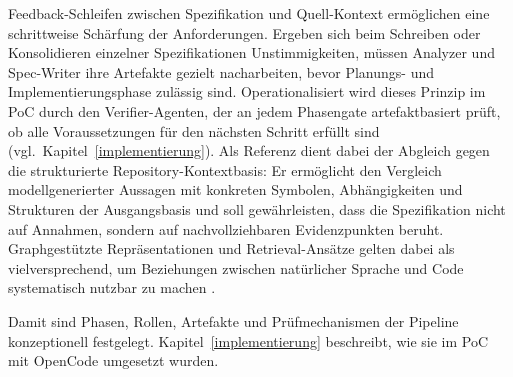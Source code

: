 Feedback-Schleifen zwischen Spezifikation und Quell-Kontext ermöglichen eine schrittweise Schärfung der Anforderungen. Ergeben sich beim Schreiben oder Konsolidieren einzelner Spezifikationen Unstimmigkeiten, müssen Analyzer und Spec-Writer ihre Artefakte gezielt nacharbeiten, bevor Planungs- und Implementierungsphase zulässig sind. Operationalisiert wird dieses Prinzip im PoC durch den Verifier-Agenten, der an jedem Phasengate artefaktbasiert prüft, ob alle Voraussetzungen für den nächsten Schritt erfüllt sind (vgl.\ Kapitel~\ref{implementierung}). Als Referenz dient dabei der Abgleich gegen die strukturierte Repository-Kontextbasis: Er ermöglicht den Vergleich modellgenerierter Aussagen mit konkreten Symbolen, Abhängigkeiten und Strukturen der Ausgangsbasis und soll gewährleisten, dass die Spezifikation nicht auf Annahmen, sondern auf nachvollziehbaren Evidenzpunkten beruht. Graphgestützte Repräsentationen und Retrieval-Ansätze gelten dabei als vielversprechend, um Beziehungen zwischen natürlicher Sprache und Code systematisch nutzbar zu machen \parencite{du2024codegrag}.

Damit sind Phasen, Rollen, Artefakte und Prüfmechanismen der Pipeline konzeptionell festgelegt. Kapitel~\ref{implementierung} beschreibt, wie sie im PoC mit OpenCode umgesetzt wurden.
